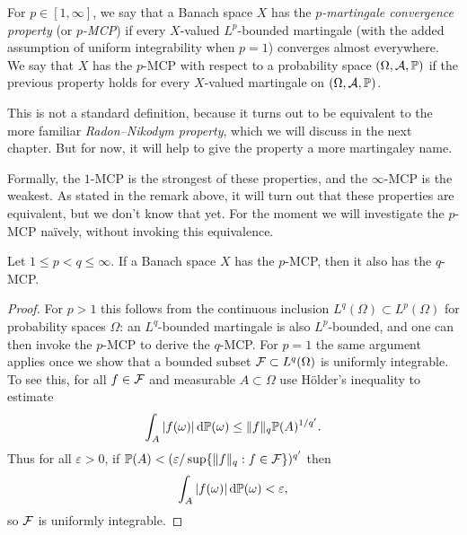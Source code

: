 \begin{defn}
  For $p \in [1,\infty]$, we say that a Banach space $X$ has the \emph{$p$-martingale convergence property} (or \emph{$p$-MCP}) if every $X$-valued $L^p$-bounded martingale (with the added assumption of uniform integrability when $p=1$) converges almost everywhere.
  We say that $X$ has the $p$-MCP with respect to a probability space $(\Omega,\mathcal{A},\mathbb{P})$ if the previous property holds for every $X$-valued martingale on $(\Omega,\mathcal{A},\mathbb{P})$.
\end{defn}

\begin{rmk}
  This is not a standard definition, because it turns out to be equivalent to the more familiar \emph{Radon--Nikodym property}, which we will discuss in the next chapter. But for now, it will help to give the property a more martingaley name.
\end{rmk}

Formally, the $1$-MCP is the strongest of these properties, and the $\infty$-MCP is the weakest.
As stated in the remark above, it will turn out that these properties are equivalent, but we don't know that yet.
For the moment we will investigate the $p$-MCP na\"ively, without invoking this equivalence.

\begin{prop}
  Let $1 \leq p < q \leq \infty$.
  If a Banach space $X$ has the $p$-MCP, then it also has the $q$-MCP.
\end{prop}

\begin{proof}
  For $p > 1$ this follows from the continuous inclusion $L^q(\Omega) \subset L^p(\Omega)$ for probability spaces $\Omega$: an $L^q$-bounded martingale is also $L^p$-bounded, and one can then invoke the $p$-MCP to derive the $q$-MCP.
  For $p = 1$ the same argument applies once we show that a bounded subset $\mathcal{F} \subset L^q(\Omega)$ is uniformly integrable.
  To see this, for all $f \in \mathcal{F}$ and measurable $A \subset \Omega$ use H\"older's inequality to estimate
  \begin{equation*}
    \int_{A} |f(\omega)| \, \mathrm{d}\mathbb{P}(\omega) \leq \|f\|_{q} \mathbb{P}(A)^{1/q'}.
  \end{equation*}
  Thus for all $\varepsilon > 0$, if $\mathbb{P}(A) < (\varepsilon/\sup\{\|f\|_q : f \in \mathcal{F}\})^{q'}$ then
  \begin{equation*}
    \int_{A} |f(\omega)| \, \mathrm{d}\mathbb{P}(\omega) < \varepsilon,
  \end{equation*}
  so $\mathcal{F}$ is uniformly integrable.
\end{proof}

